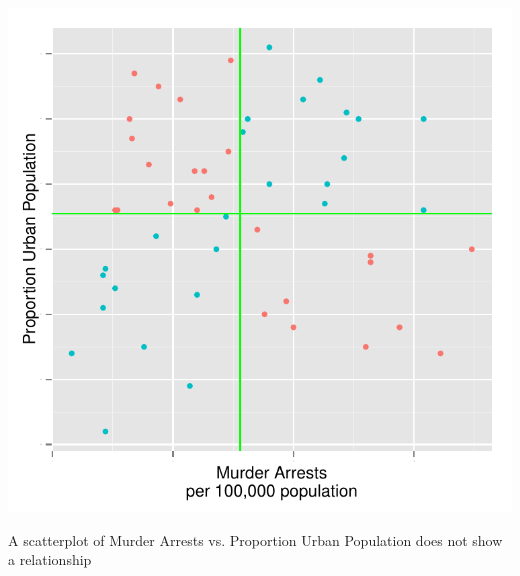 \documentclass[nohyper,justified]{tufte-handout}\usepackage[]{graphicx}\usepackage[]{color}
\makeatletter
\def\maxwidth{ %
  \ifdim\Gin@nat@width>\linewidth
    \linewidth
  \else
    \Gin@nat@width
  \fi
}
\newenvironment{knitrout}{}{} %
\makeatother
\begin{document}
\begin{knitrout}
\color{fgcolor}\begin{marginfigure}

{\centering \includegraphics[width=\maxwidth]{figure/graphics-scatterplotsyz-1} 

}

\caption[A scatterplot of Murder Arrests vs]{A scatterplot of Murder Arrests vs. Proportion Urban Population does not show a relationship}\label{fig:scatterplotsyz}
\end{marginfigure}


\end{knitrout}
\end{document}
